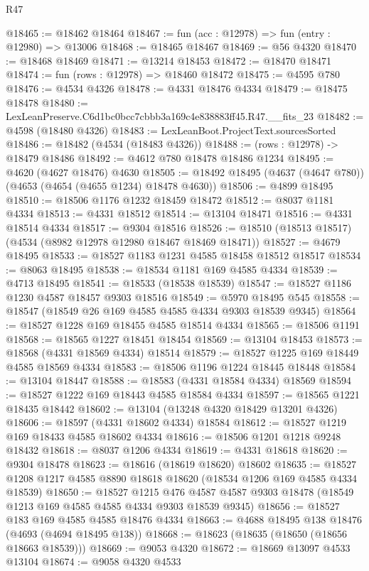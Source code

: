 \begin{lexlean}{R47}
\begin{coremodule}
@18465 := @18462 @18464
@18467 := fun (acc : @12978) => fun (entry : @12980) => @13006
@18468 := @18465 @18467
@18469 := @56 @4320
@18470 := @18468 @18469
@18471 := @13214 @18453
@18472 := @18470 @18471
@18474 := fun (rows : @12978) => @18460 @18472
@18475 := @4595 @780
@18476 := @4534 @4326
@18478 := @4331 @18476 @4334
@18479 := @18475 @18478
@18480 := LexLeanPreserve.C6d1bc0bcc7cbbb3a169c4e838883ff45.R47.__fits_23
@18482 := @4598 (@18480 @4326)
@18483 := LexLeanBoot.ProjectText.sourcesSorted
@18486 := @18482 (@4534 (@18483 @4326))
@18488 := (rows : @12978) -> @18479 @18486
@18492 := @4612 @780 @18478 @18486 @1234
@18495 := @4620 (@4627 @18476) @4630
@18505 := @18492 @18495 (@4637 (@4647 @780)) (@4653 (@4654 (@4655 @1234) @18478 @4630))
@18506 := @4899 @18495
@18510 := @18506 @1176 @1232 @18459 @18472
@18512 := @8037 @1181 @4334
@18513 := @4331 @18512
@18514 := @13104 @18471
@18516 := @4331 @18514 @4334
@18517 := @9304 @18516
@18526 := @18510 (@18513 @18517) (@4534 (@8982 @12978 @12980 @18467 @18469 @18471))
@18527 := @4679 @18495
@18533 := @18527 @1183 @1231 @4585 @18458 @18512 @18517
@18534 := @8063 @18495
@18538 := @18534 @1181 @169 @4585 @4334
@18539 := @4713 @18495
@18541 := @18533 (@18538 @18539)
@18547 := @18527 @1186 @1230 @4587 @18457 @9303 @18516
@18549 := @5970 @18495 @545
@18558 := @18547 (@18549 @26 @169 @4585 @4585 @4334 @9303 @18539 @9345)
@18564 := @18527 @1228 @169 @18455 @4585 @18514 @4334
@18565 := @18506 @1191
@18568 := @18565 @1227 @18451 @18454
@18569 := @13104 @18453
@18573 := @18568 (@4331 @18569 @4334) @18514
@18579 := @18527 @1225 @169 @18449 @4585 @18569 @4334
@18583 := @18506 @1196 @1224 @18445 @18448
@18584 := @13104 @18447
@18588 := @18583 (@4331 @18584 @4334) @18569
@18594 := @18527 @1222 @169 @18443 @4585 @18584 @4334
@18597 := @18565 @1221 @18435 @18442
@18602 := @13104 (@13248 @4320 @18429 @13201 @4326)
@18606 := @18597 (@4331 @18602 @4334) @18584
@18612 := @18527 @1219 @169 @18433 @4585 @18602 @4334
@18616 := @18506 @1201 @1218 @9248 @18432
@18618 := @8037 @1206 @4334
@18619 := @4331 @18618
@18620 := @9304 @18478
@18623 := @18616 (@18619 @18620) @18602
@18635 := @18527 @1208 @1217 @4585 @8890 @18618 @18620 (@18534 @1206 @169 @4585 @4334 @18539)
@18650 := @18527
    @1215
    @476
    @4587
    @4587
    @9303
    @18478
    (@18549 @1213 @169 @4585 @4585 @4334 @9303 @18539 @9345)
@18656 := @18527 @183 @169 @4585 @4585 @18476 @4334
@18663 := @4688 @18495 @138 @18476 (@4693 (@4694 @18495 @138))
@18668 := @18623 (@18635 (@18650 (@18656 @18663 @18539)))
@18669 := @9053 @4320
@18672 := @18669 @13097 @4533 @13104
@18674 := @9058 @4320 @4533

\end{coremodule}
\end{lexlean}
